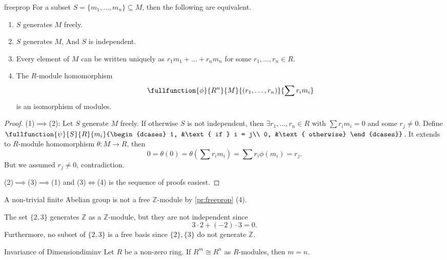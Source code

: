 \begin{proposition}{}{freeprop}
    For a subset \(S = \{m_1, \dots, m_n\} \subseteq M\), then the following are equivalent.
    \begin{enumerate}
        \item \(S\) generates \(M\) freely.
        \item \(S\) generates \(M\), And \(S\) is independent.
        \item Every element of \(M\) can be written uniquely as \(r_1 m_1 + \dots + r_n m_n\) for some \(r_1, \dots, r_n \in R\).
        \item The \(R\)-module homomorphism
        \[
            \fullfunction{\phi}{R^n}{M}{(r_1,\dots, r_n)}{\sum r_i m_i}
        \]
        is an isomorphism of modules.
    \end{enumerate}
\end{proposition}
\begin{proof}
    (1)\(\implies\)(2): Let \(S\) generate \(M\) freely. If otherwise \(S\) is not independent, then \(\exists r_1, \dots, r_n \in R\) with \(\sum r_i m_i = 0\) and some \(r_j \neq 0\). Define \(\fullfunction{\psi}{S}{R}{m_i}{\begin{dcases}
        1, &\text{ if } i = j\\
        0, &\text{ otherwise}
    \end{dcases}}\). It extends to \(R\)-module homomorphism \(\theta: M \to R\), then
    \[
        0 = \theta(0) = \theta(\sum r_i m_i) = \sum r_i \phi(m_i) = r_j.
    \]
    But we assumed \(r_j \neq 0\), contradiction.

    (2)\(\implies\)(3)\(\implies\)(1) and (3)\(\iff\)(4) is the sequence of proofs easiest.
\end{proof}
\begin{example}
    A non-trivial finite Abelian group is not a free \(\mathbb{Z}\)-module by \cref{pr:freeprop} (4).
\end{example}
\begin{example}
    The set \(\{2, 3\}\) generates \(\mathbb{Z}\) as a \(\mathbb{Z}\)-module, but they are not independent since
    \[
        3 \cdot 2 + (-2) \cdot 3 = 0.
    \]
    Furthermore, no subset of \(\{2,3\}\) is a free basis since \(\{2\}, \{3\}\) do not generate \(\mathbb{Z}\).
\end{example}
\begin{proposition}{Invariance of Dimension}{diminv}
    Let \(R\) be a non-zero ring. If \(R^m \cong R^n\) as \(R\)-modules, then \(m = n\).
\end{proposition}

